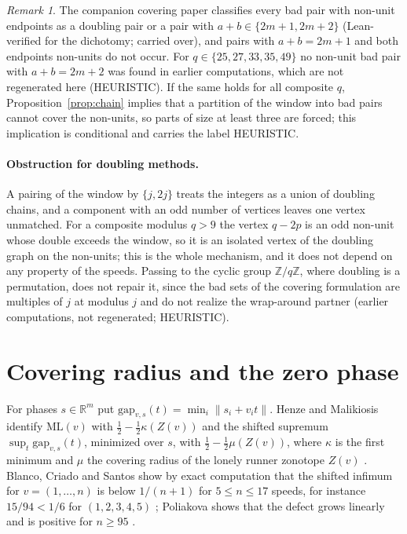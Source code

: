 \documentclass[11pt]{article}
\theoremstyle{remark}
\newtheorem{remark}[theorem]{Remark}
\newcommand{\norm}[1]{\lVert #1\rVert}
\newcommand{\ML}{\mathrm{ML}}
\newcommand{\gap}{\mathrm{gap}}
\newcommand{\Z}{\mathbb{Z}}
\newcommand{\R}{\mathbb{R}}
\begin{document}
\begin{remark}
The companion covering paper classifies every bad pair with non-unit endpoints as a doubling pair or a pair with $a+b\in\{2m+1,2m+2\}$ (Lean-verified for the dichotomy; carried over), and pairs with $a+b=2m+1$ and both endpoints non-units do not occur. For $q\in\{25,27,33,35,49\}$ no non-unit bad pair with $a+b=2m+2$ was found in earlier computations, which are not regenerated here (HEURISTIC). If the same holds for all composite $q$, Proposition~\ref{prop:chain} implies that a partition of the window into bad pairs cannot cover the non-units, so parts of size at least three are forced; this implication is conditional and carries the label HEURISTIC.
\end{remark}

\paragraph{Obstruction for doubling methods.} A pairing of the window by $\{j,2j\}$ treats the integers as a union of doubling chains, and a component with an odd number of vertices leaves one vertex unmatched. For a composite modulus $q>9$ the vertex $q-2p$ is an odd non-unit whose double exceeds the window, so it is an isolated vertex of the doubling graph on the non-units; this is the whole mechanism, and it does not depend on any property of the speeds. Passing to the cyclic group $\Z/q\Z$, where doubling is a permutation, does not repair it, since the bad sets of the covering formulation are multiples of $j$ at modulus $j$ and do not realize the wrap-around partner (earlier computations, not regenerated; HEURISTIC).

\section{Covering radius and the zero phase}\label{sec:phase}

For phases $s\in\R^m$ put $\gap_{v,s}(t)=\min_i\norm{s_i+v_it}$. Henze and Malikiosis identify $\ML(v)$ with $\frac12-\frac12\kappa(Z(v))$ and the shifted supremum $\sup_t\gap_{v,s}(t)$, minimized over $s$, with $\frac12-\frac12\mu(Z(v))$, where $\kappa$ is the first minimum and $\mu$ the covering radius of the lonely runner zonotope $Z(v)$ \cite[Prop.~1.7]{BCS26}. Blanco, Criado and Santos show by exact computation that the shifted infimum for $v=(1,\dots,n)$ is below $1/(n+1)$ for $5\le n\le17$ speeds, for instance $15/94<1/6$ for $(1,2,3,4,5)$ \cite[Prop.~5.11, 5.14, Thm.~1.8]{BCS26}; Poliakova shows that the defect grows linearly and is positive for $n\ge95$ \cite[Thm.~1, 2]{Poliak26}.
\end{document}
